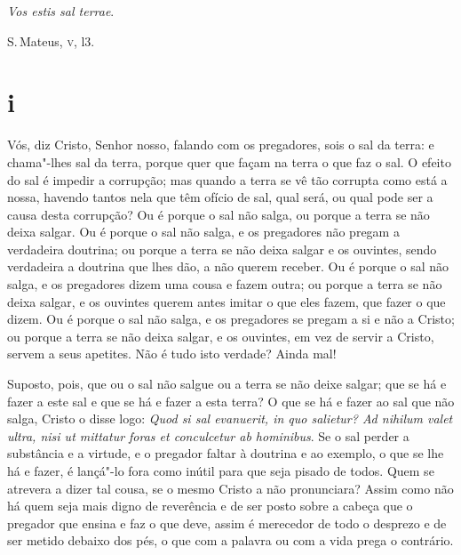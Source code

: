 \epigraph{\emph{Vos estis sal terrae}.}{S.\,Mateus, \textsc{v}, l3.}

\section*{i}

\noindent{}Vós, diz Cristo, Senhor nosso, falando com os pregadores, sois o sal da
terra: e chama"-lhes sal da terra, porque quer que façam na terra o que
faz o sal. O efeito do sal é impedir a corrupção; mas quando a terra se
vê tão corrupta como está a nossa, havendo tantos nela que têm ofício de
sal, qual será, ou qual pode ser a causa desta corrupção? Ou é porque o
sal não salga, ou porque a terra se não deixa salgar. Ou é porque o sal
não salga, e os pregadores não pregam a verdadeira doutrina; ou porque a
terra se não deixa salgar e os ouvintes, sendo verdadeira a doutrina que
lhes dão, a não querem receber. Ou é porque o sal não salga, e os
pregadores dizem uma cousa e fazem outra; ou porque a terra se não deixa
salgar, e os ouvintes querem antes imitar o que eles fazem, que fazer o
que dizem. Ou é porque o sal não salga, e os pregadores se pregam a si e
não a Cristo; ou porque a terra se não deixa salgar, e os ouvintes, em
vez de servir a Cristo, servem a seus apetites. Não é tudo isto verdade?
Ainda mal!

Suposto, pois, que ou o sal não salgue ou a terra se não deixe salgar;
que se há e fazer a este sal e que se há e fazer a esta terra? O que se
há e fazer ao sal que não salga, Cristo o disse logo: \emph{Quod si sal
evanuerit, in quo salietur? Ad nihilum valet ultra, nisi ut mittatur
foras et conculcetur ab hominibus}. Se o sal perder a substância e a
virtude, e o pregador faltar à doutrina e ao exemplo, o que se lhe há e
fazer, é lançá"-lo fora como inútil para que seja pisado de todos. Quem
se atrevera a dizer tal cousa, se o mesmo Cristo a não pronunciara?
Assim como não há quem seja mais digno de reverência e de ser posto
sobre a cabeça que o pregador que ensina e faz o que deve, assim é
merecedor de todo o desprezo e de ser metido debaixo dos pés, o que com
a palavra ou com a vida prega o contrário.


